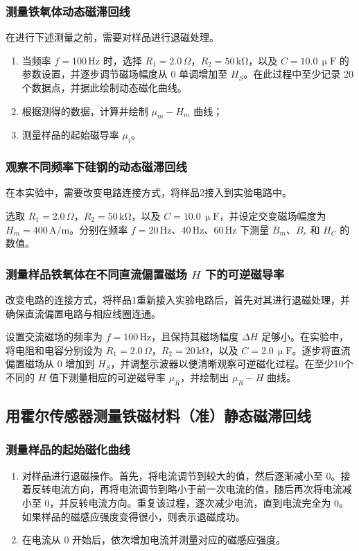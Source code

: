 \documentclass[UTF-8,twoside,cs4size]{ctexart}
\begin{document}
\subsubsection{测量铁氧体动态磁滞回线}
在进行下述测量之前，需要对样品进行退磁处理。

\begin{enumerate}
    \item 当频率 $f=100\,\mathrm{Hz}$ 时，选择 $R_1=2.0\,\Omega$，$R_2=50\,\mathrm{k\Omega}$，以及 $C=10.0\,\upmu\mathrm{F}$ 的参数设置，并逐步调节磁场幅度从 $0$ 单调增加至 $H_S$。在此过程中至少记录 20 个数据点，并据此绘制动态磁化曲线。
    
    \item 根据测得的数据，计算并绘制 $\mu_m-H_m$ 曲线；
    
    \item 测量样品的起始磁导率 $\mu_i$。
\end{enumerate}

\subsubsection{观察不同频率下硅钢的动态磁滞回线}
在本实验中，需要改变电路连接方式，将样品2接入到实验电路中。

选取 $R_1=2.0\,\Omega$，$R_2=50\,\mathrm{k\Omega}$，以及 $C=10.0\,\upmu\mathrm{F}$，并设定交变磁场幅度为 $H_m=400\,\mathrm{A/m}$。分别在频率 $f=20\,\mathrm{Hz}$、$40\,\mathrm{Hz}$、$60\,\mathrm{Hz}$ 下测量 $B_m$、$B_r$ 和 $H_C$ 的数值。

\subsubsection{测量样品铁氧体在不同直流偏置磁场 $H$ 下的可逆磁导率}

改变电路的连接方式，将样品1重新接入实验电路后，首先对其进行退磁处理，并确保直流偏置电路与相应线圈连通。

设置交流磁场的频率为 $f=100\,\mathrm{Hz}$，且保持其磁场幅度 $\Delta H$ 足够小。在实验中，将电阻和电容分别设为 $R_1=2.0\,\Omega$，$R_2=20\,\mathrm{k\Omega}$，以及 $C=2.0\,\upmu\mathrm{F}$。逐步将直流偏置磁场从 $0$ 增加到 $H_S$，并调整示波器以便清晰观察可逆磁化过程。在至少10个不同的 $H$ 值下测量相应的可逆磁导率 $\mu_R$，并绘制出 $\mu_R-H$ 曲线。

\subsection{用霍尔传感器测量铁磁材料（准）静态磁滞回线}
\subsubsection{测量样品的起始磁化曲线}
\begin{enumerate}
    \item 对样品进行退磁操作。首先，将电流调节到较大的值，然后逐渐减小至 0。接着反转电流方向，再将电流调节到略小于前一次电流的值，随后再次将电流减小至 0，并反转电流方向。重复该过程，逐次减少电流，直到电流完全为 0。如果样品的磁感应强度变得很小，则表示退磁成功。
    
    \item 在电流从 0 开始后，依次增加电流并测量对应的磁感应强度。
\end{enumerate}
\end{document}
